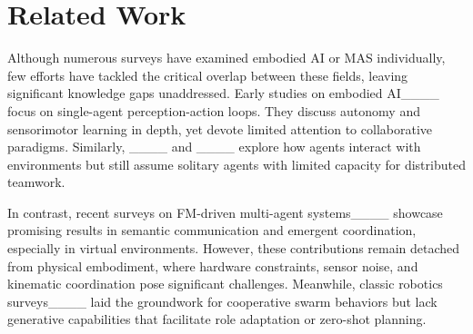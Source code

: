 \section{Related Work}






Although numerous surveys have examined embodied AI or MAS individually, few efforts have tackled the critical overlap between these fields, leaving significant knowledge gaps unaddressed.
Early studies on embodied AI____ focus on single-agent perception-action loops. 
They discuss autonomy and sensorimotor learning in depth, yet devote limited attention to collaborative paradigms. 
Similarly, ____ and ____ explore how agents interact with environments but still assume solitary agents with limited capacity for distributed teamwork.

In contrast, recent surveys on FM-driven multi-agent systems____ showcase promising results in semantic communication and emergent coordination, especially in virtual environments. 
However, these contributions remain detached from physical embodiment, where hardware constraints, sensor noise, and kinematic coordination pose significant challenges. 
Meanwhile, classic robotics surveys____ laid the groundwork for cooperative swarm behaviors but lack generative capabilities that facilitate role adaptation or zero-shot planning.

